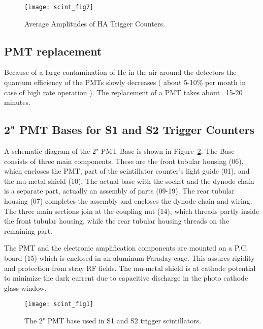 \begin{figure}[hp]
\begin{center}
\texttt{[image: scint\_fig7]}
{\linespread{1.}
\caption[Detectors: Average Amplitudes of HA Trigger Counters]
{ Average Amplitudes of HA Trigger Counters.}
\label{fig:scinamp}}
\end{center}
\end{figure}

\subsection{PMT replacement}

Because of a large contamination of He in the air around the detectors the quantum efficiency of
the PMTs slowly decreases ( about 5-10\% per month in case of high rate operation ). 
The replacement of a PMT takes about ~15-20 minutes.

\subsection{ 2" PMT Bases for S1 and S2 Trigger Counters}

A schematic diagram of the 2" PMT Base is shown in Figure~\ref{fig:scint_1}. 
The Base consists of three main components. 
These are the front tubular housing (06), which encloses the PMT, part of the scintillator 
counter's light guide (01), and the mu-metal shield (10). The actual base with 
the socket and the dynode chain is a separate part, actually an assembly of parts 
(09-19). The rear tubular housing (07) completes the assembly and encloses the 
dynode chain and wiring. The three main sections join at the coupling nut (14), 
which threads partly inside the front tubular housing, while the rear tubular 
housing threads on the remaining part.

The PMT and the electronic amplification components are mounted on a P.C. board 
(15) which is enclosed in an aluminum Faraday cage. This assures rigidity and 
protection from stray RF fields. The mu-metal shield is at cathode potential to 
minimize the dark current due to capacitive discharge in the photo cathode 
glass window.
\begin{figure}
\begin{center}
\texttt{[image: scint\_fig1]}
{\linespread{1.}
\caption[Detectors: 2'' PMT Base]{The 2" PMT base used in S1 and S2 trigger scintillators.}
\label{fig:scint_1}}
\end{center}
\end{figure}

